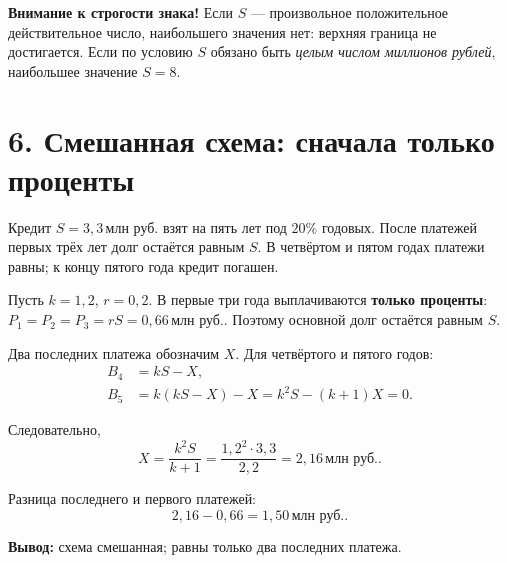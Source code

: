 \documentclass[a4paper,12pt]{article}
\newcommand{\key}[1]{\textcolor{darkaccent}{\textbf{#1}}}
\newcommand{\fboxeq}[1]{\[\boxed{#1}\]}
\newcommand{\mln}{\,\text{млн руб.}}
\begin{document}
\key{Внимание к строгости знака!} Если $S$ --- произвольное положительное действительное число, наибольшего значения нет: верхняя граница не достигается. Если по условию $S$ обязано быть \emph{целым числом миллионов рублей}, наибольшее значение $S=8$.

\section*{6. Смешанная схема: сначала только проценты}

Кредит $S=3{,}3\mln$ взят на пять лет под $20\%$ годовых. После платежей первых трёх лет долг остаётся равным $S$. В четвёртом и пятом годах платежи равны; к концу пятого года кредит погашен.

Пусть $k=1{,}2$, $r=0{,}2$. В первые три года выплачиваются \key{только проценты}: $P_1=P_2=P_3=rS=0{,}66\mln$. Поэтому основной долг остаётся равным $S$.

Два последних платежа обозначим $X$. Для четвёртого и пятого годов:
\[
\begin{aligned}
B_4&=kS-X,\\
B_5&=k(kS-X)-X=k^2S-(k+1)X=0.
\end{aligned}
\]

Следовательно,
\[
X=\frac{k^2S}{k+1}
=\frac{1{,}2^2\cdot3{,}3}{2{,}2}=2{,}16\mln.
\]

Разница последнего и первого платежей:
\fboxeq{2{,}16-0{,}66=1{,}50\mln.}

\textbf{Вывод:} схема смешанная; равны только два последних платежа.

\clearpage
\end{document}
